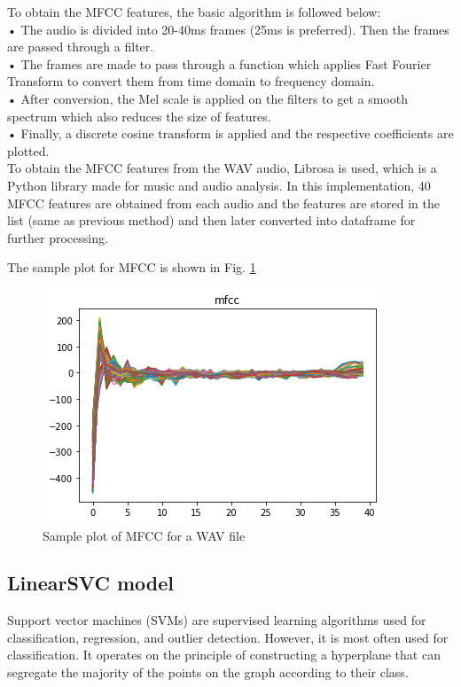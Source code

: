 \documentclass[pdflatex]{sn-jnl}%
\theoremstyle{thmstyleone}%
\theoremstyle{thmstyletwo}%
\theoremstyle{thmstylethree}%
\begin{document}
To obtain the MFCC features, the basic algorithm is followed
below:\\
• The audio is divided into 20-40ms frames (25ms is
preferred). Then the frames are passed through a filter.\\
• The frames are made to pass through a function
which applies Fast Fourier Transform to convert them
from time domain to frequency domain.\\
• After conversion, the Mel scale is applied on the filters
to get a smooth spectrum which also reduces the size of
features.\\
• Finally, a discrete cosine transform is applied and the
respective coefficients are plotted.\\
To obtain the MFCC features from the WAV audio, Librosa
is used, which is a Python library made for music and
audio analysis. In this implementation, 40 MFCC features are
obtained from each audio and the features are stored in the
list (same as previous method) and then later converted into
dataframe for further processing.

The sample plot for MFCC is shown in Fig. \ref{mfcc}

\begin{figure}[htbp]
	\centerline{\includegraphics[scale=0.5]{mfcc.png}}
	\caption{Sample plot of MFCC for a WAV file}
	\label{mfcc}
\end{figure}

\subsection{LinearSVC model}
Support vector machines (SVMs) are supervised learning algorithms used for classification, regression, and outlier detection.
However, it is most often used for classification.
It operates on the principle of constructing a hyperplane that can segregate the majority of the points on the graph according to their class.
\end{document}
